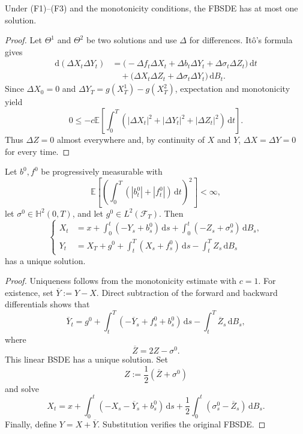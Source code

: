 \begin{thm}
Under \textup{(F1)}--\textup{(F3)} and the monotonicity conditions, the
FBSDE has at most one solution.
\end{thm}

\begin{proof}
Let $\Theta^1$ and $\Theta^2$ be two solutions and use $\Delta$ for
differences.  It\^o's formula gives
\[
\begin{aligned}
  \mathrm d(\Delta X_t\Delta Y_t)
  &=\bigl(
    -\Delta f_t\Delta X_t
    +\Delta b_t\Delta Y_t
    +\Delta\sigma_t\Delta Z_t
  \bigr)\,\mathrm dt\\
  &\quad+\bigl(
    \Delta X_t\Delta Z_t
    +\Delta\sigma_t\Delta Y_t
  \bigr)\,\mathrm dB_t.
\end{aligned}
\]
Since $\Delta X_0=0$ and
$\Delta Y_T=g(X_T^1)-g(X_T^2)$, expectation and monotonicity yield
\[
  0\le
  -c\mathbb E\!\left[
    \int_0^T(|\Delta X_t|^2+|\Delta Y_t|^2+|\Delta Z_t|^2)\,\mathrm dt
  \right].
\]
Thus $\Delta Z=0$ almost everywhere and, by continuity of $X$ and $Y$,
$\Delta X=\Delta Y=0$ for every time.
\end{proof}

\begin{lem}
Let $b^0,f^0$ be progressively measurable with
\[
  \mathbb E\!\left[
    \left(\int_0^T(|b_t^0|+|f_t^0|)\,\mathrm dt\right)^2
  \right]<\infty,
\]
let $\sigma^0\in\mathbb H^2(0,T)$, and let
$g^0\in L^2(\mathcal F_T)$.  Then
\[
\left\{
\begin{aligned}
  X_t
  &=x+\int_0^t(-Y_s+b_s^0)\,\mathrm ds
      +\int_0^t(-Z_s+\sigma_s^0)\,\mathrm dB_s,\\
  Y_t
  &=X_T+g^0+\int_t^T(X_s+f_s^0)\,\mathrm ds
      -\int_t^T Z_s\,\mathrm dB_s
\end{aligned}
\right.
\]
has a unique solution.
\end{lem}

\begin{proof}
Uniqueness follows from the monotonicity estimate with $c=1$.  For
existence, set $\overline Y:=Y-X$.  Direct subtraction of the forward
and backward differentials shows that
\[
  \overline Y_t
  =g^0+\int_t^T(-\overline Y_s+f_s^0+b_s^0)\,\mathrm ds
      -\int_t^T\overline Z_s\,\mathrm dB_s,
\]
where
\[
  \overline Z=2Z-\sigma^0.
\]
This linear BSDE has a unique solution.  Set
\[
  Z:=\frac12(\overline Z+\sigma^0)
\]
and solve
\[
  X_t=x+\int_0^t(-X_s-\overline Y_s+b_s^0)\,\mathrm ds
      +\frac12\int_0^t(\sigma_s^0-\overline Z_s)\,\mathrm dB_s.
\]
Finally, define $Y=X+\overline Y$.  Substitution verifies the original
FBSDE\@.
\end{proof}

